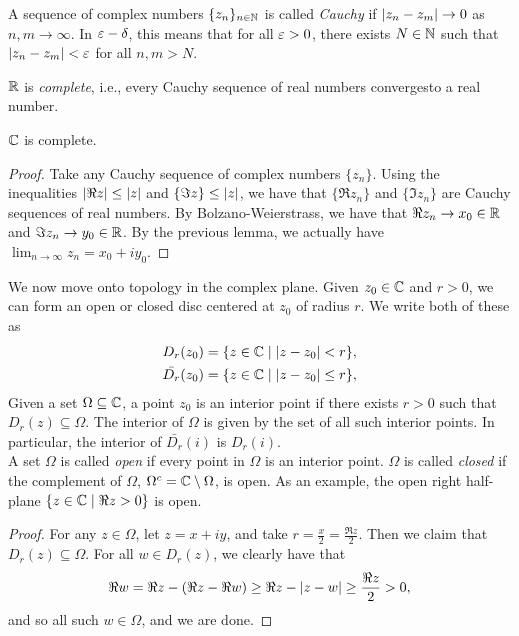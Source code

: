 \noindent A sequence of complex numbers $\{z_n\}_{n \in \mathbb N}$ is called \textit{Cauchy} if $\left\lvert z_n - z_m \right\rvert \to 0$ as $n, m \to \infty$. In $\varepsilon-\delta$, this means that for all $\varepsilon > 0$, there exists $N \in \mathbb N$ such that $\left\lvert z_n - z_m \right\rvert < \varepsilon$ for all $n, m > N$.
\begin{theorem}
    $\mathbb R$ is \textit{complete}, i.e., every Cauchy sequence of real numbers convergesto a real number.
\end{theorem}
\begin{theorem}
    $\mathbb C$ is complete.
\end{theorem}
\begin{proof}
    Take any Cauchy sequence of complex numbers $\{z_n\}$. Using the inequalities $\left\lvert \Re z \right\rvert \leq \left\lvert z \right\rvert$ and $\{\Im z\} \leq \left\lvert z \right\rvert$, we have that $\{\Re z_n\}$ and $\{\Im z_n\}$ are Cauchy sequences of real numbers. By Bolzano-Weierstrass, we have that $\Re z_n \to x_0 \in \mathbb R$ and $\Im z_n \to y_0 \in \mathbb R$. By the previous lemma, we actually have $\lim_{n \to \infty} z_n = x_0 + i y_0$.
\end{proof}
\noindent We now move onto topology in the complex plane. Given $z_0 \in \mathbb C$ and $r > 0$, we can form an open or closed disc centered at $z_0$ of radius $r$. We write both of these as
\begin{align*}
    D_r(z_0) &= \{z \in \mathbb C \mid \left\lvert z - z_0 \right\rvert < r\}, \\
    \bar{D_r}(z_0) &= \{z \in \mathbb C \mid \left\lvert z - z_0 \right\rvert \leq r\},
\end{align*}
Given a set $\Omega \subseteq \mathbb C$, a point $z_0$ is an interior point if there exists $r > 0$ such that $D_r(z) \subseteq \Omega$. The interior of $\Omega$ is given by the set of all such interior points. In particular, the interior of $\bar{D_r}(i)$ is $D_r(i)$.
\\[8pt]
A set $\Omega$ is called \textit{open} if every point in $\Omega$ is an interior point. $\Omega$ is called \textit{closed} if the complement of $\Omega$, $\Omega^c = \mathbb C \setminus \Omega$, is open. As an example, the open right half-plane $\{z \in \mathbb C \mid \Re z > 0\}$ is open.
\begin{proof}
    For any $z \in \Omega$, let $z = x + iy$, and take $r = \frac{x}{2} = \frac{\Re z}{2}$. Then we claim that $D_r(z) \subseteq \Omega$. For all $w \in D_r(z)$, we clearly have that
    \[ \Re w = \Re z - (\Re z - \Re w) \geq \Re z - \left\lvert z - w \right\rvert \geq \frac{\Re z}{2} > 0, \]
    and so all such $w \in \Omega$, and we are done. 
\end{proof}
